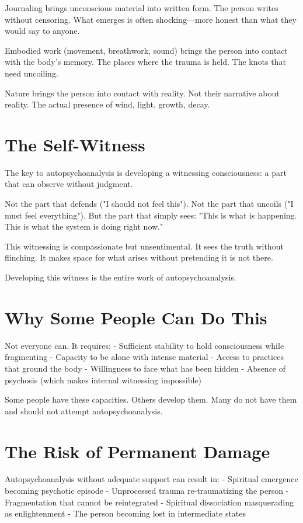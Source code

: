 \documentclass[12pt]{article}
\begin{document}
Journaling brings unconscious material into written form. The person writes without censoring. What emerges is often shocking—more honest than what they would say to anyone.

Embodied work (movement, breathwork, sound) brings the person into contact with the body's memory. The places where the trauma is held. The knots that need uncoiling.

Nature brings the person into contact with reality. Not their narrative about reality. The actual presence of wind, light, growth, decay.

\section{The Self-Witness}

The key to autopsychoanalysis is developing a witnessing consciousness: a part that can observe without judgment.

Not the part that defends ("I should not feel this").
Not the part that uncoils ("I must feel everything").
But the part that simply sees: "This is what is happening. This is what the system is doing right now."

This witnessing is compassionate but unsentimental. It sees the truth without flinching. It makes space for what arises without pretending it is not there.

Developing this witness is the entire work of autopsychoanalysis.

\section{Why Some People Can Do This}

Not everyone can. It requires:
- Sufficient stability to hold consciousness while fragmenting
- Capacity to be alone with intense material
- Access to practices that ground the body
- Willingness to face what has been hidden
- Absence of psychosis (which makes internal witnessing impossible)

Some people have these capacities. Others develop them. Many do not have them and should not attempt autopsychoanalysis.

\section{The Risk of Permanent Damage}

Autopsychoanalysis without adequate support can result in:
- Spiritual emergence becoming psychotic episode
- Unprocessed trauma re-traumatizing the person
- Fragmentation that cannot be reintegrated
- Spiritual dissociation masquerading as enlightenment
- The person becoming lost in intermediate states
\end{document}
